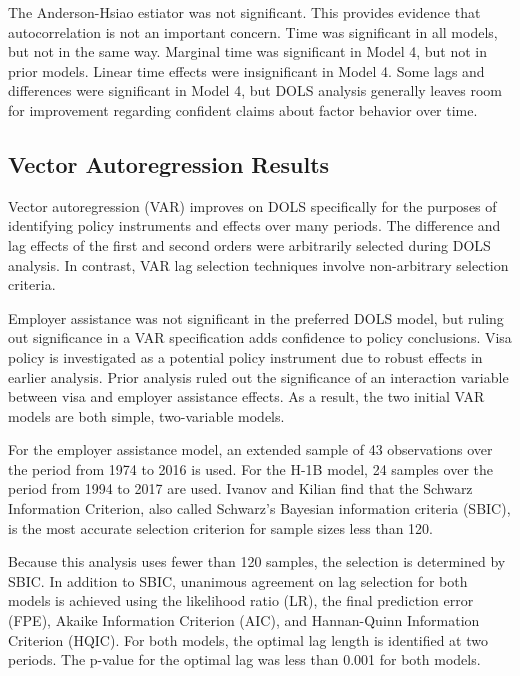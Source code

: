 \documentclass[review]{elsarticle}
\begin{document}
The Anderson-Hsiao estiator was not significant.
This provides evidence that autocorrelation is not an important concern.
Time was significant in all models, but not in the same way.
Marginal time was significant in Model 4, but not in prior models.
Linear time effects were insignificant in Model 4.
Some lags and differences were significant in Model 4,
but DOLS analysis generally leaves room for improvement regarding confident
claims about factor behavior over time.

\subsection{Vector Autoregression Results}
Vector autoregression (VAR) improves on DOLS specifically for the purposes
of identifying policy instruments and effects over many periods.
The difference and lag effects of the first and second orders were arbitrarily selected during DOLS analysis.
In contrast, VAR lag selection techniques involve non-arbitrary selection criteria.

Employer assistance was not significant in the preferred DOLS model,
but ruling out significance in a VAR specification adds confidence to policy conclusions.
Visa policy is investigated as a potential policy instrument due to robust effects in earlier analysis.
Prior analysis ruled out the significance of an interaction variable between
visa and employer assistance effects.
As a result, the two initial VAR models are both simple, two-variable models.

For the employer assistance model,
an extended sample of 43 observations
over the period from 1974 to 2016 is used.
For the H-1B model, 24 samples over the period from 1994 to 2017 are used.
Ivanov and Kilian find that the Schwarz Information Criterion,
also called Schwarz's Bayesian information criteria (SBIC),
is the most accurate selection criterion for sample sizes less than 120\cite{ivanov2005practitioner}.

Because this analysis uses fewer than 120 samples, the selection is determined by SBIC.
In addition to SBIC, unanimous agreement on lag selection for both models is achieved using the likelihood ratio (LR),
the final prediction error (FPE), Akaike Information Criterion (AIC), and Hannan-Quinn Information Criterion (HQIC).
For both models, the optimal lag length is identified at two periods.
The p-value for the optimal lag was less than 0.001 for both models.
\end{document}
